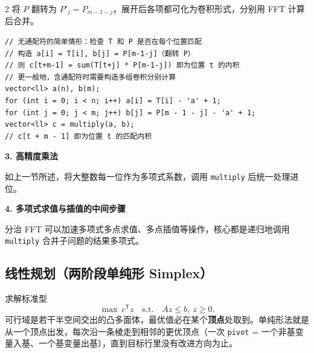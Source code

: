 \begin{multicols*}{2}
		将 $P$ 翻转为 $P'_j = P_{m-1-j}$，展开后各项都可化为卷积形式，分别用 FFT 计算后合并。

		\begin{verbatim}
// 无通配符的简单情形：检查 T 和 P 是否在每个位置匹配
// 构造 a[i] = T[i], b[j] = P[m-1-j]（翻转 P）
// 则 c[t+m-1] = sum(T[t+j] * P[m-1-j]) 即为位置 t 的内积
// 更一般地，含通配符时需要构造多组卷积分别计算
vector<ll> a(n), b(m);
for (int i = 0; i < n; i++) a[i] = T[i] - 'a' + 1;
for (int j = 0; j < m; j++) b[j] = P[m - 1 - j] - 'a' + 1;
vector<ll> c = multiply(a, b);
// c[t + m - 1] 即为位置 t 的匹配内积
		\end{verbatim}

		\textbf{3. 高精度乘法}

		如上一节所述，将大整数每一位作为多项式系数，调用 \texttt{multiply} 后统一处理进位。

		\textbf{4. 多项式求值与插值的中间步骤}

		分治 FFT 可以加速多项式多点求值、多点插值等操作，核心都是递归地调用 \texttt{multiply} 合并子问题的结果多项式。

	\end{multicols*} %

		\subsection{线性规划（两阶段单纯形 Simplex）}

		求解标准型
		$$
		\max\ c^{\mathsf T} z \quad \text{s.t.} \quad A z \le b,\ z \ge 0 .
		$$
		可行域是若干半空间交出的凸多面体，最优值必在某个\textbf{顶点}处取到。单纯形法就是从一个顶点出发，每次沿一条棱走到相邻的更优顶点（一次 \texttt{pivot} = 一个非基变量入基、一个基变量出基），直到目标行里没有改进方向为止。

